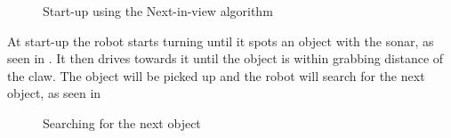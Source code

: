 \begin{figure}[H]
     \caption{\label{fig:object_navigation_niv} Start-up using the Next-in-view algorithm}
\end{figure}

At start-up the robot starts turning until it spots an object with the sonar, as seen in . It then drives towards it until the object is within grabbing distance of the claw. The object will be picked up and the robot will search for the next object, as seen in 

\begin{figure}[H]
     \caption{\label{fig:object_navigation_niv2} Searching for the next object}
\end{figure}

